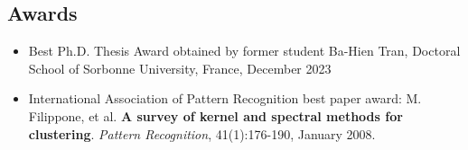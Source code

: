 \documentclass[oneside, a4paper, onecolumn, 10pt]{article}
\begin{document}


\subsection*{Awards}
\begin{itemize}
     \item Best Ph.D. Thesis Award obtained by former student Ba-Hien Tran, Doctoral School of Sorbonne University, France, December 2023
     \item 
International Association of Pattern Recognition best paper award: 
       M. Filippone, et al. %
       \textbf{A survey of kernel and spectral methods for clustering}.
       \emph{Pattern Recognition}, 41(1):176-190, January 2008.
\end{itemize}
\end{document}
